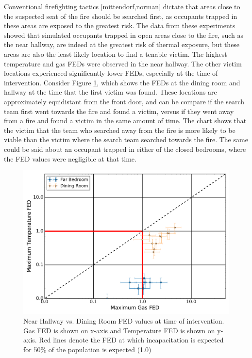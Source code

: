 \documentclass[12pt,oneside]{article}
\begin{document}
Conventional firefighting tactics [mittendorf,norman] dictate that areas close to the suspected seat of the fire should be searched first, as occupants trapped in these areas are exposed to the greatest risk. The data from these experiments showed that simulated occupants trapped in open areas close to the fire, such as the near hallway, are indeed at the greatest risk of thermal exposure, but these areas are also the least likely location to find a tenable victim. The highest temperature and gas FEDs were observed in the near hallway. The other victim locations experienced significantly lower FEDs, especially at the time of intervention. Consider Figure \ref{fig:open_FED_compare}, which shows the FEDs at the dining room and hallway at the time that the first victim was found. These locations are approximately equidistant from the front door, and can be compare if the search team first went towards the fire and found a victim, versus if they went away from a fire and found a victim in the same amount of time. The chart shows that the victim that the team who searched away from the fire is more likely to be viable than the victim where the search team searched towards the fire. The same could be said about an occupant trapped in either of the closed bedrooms, where the FED values were negligible at that time.  

\begin{figure}[!ht]
	\centering
	\includegraphics[width=.75\textwidth]{../Figures/br_compare/Far}
	\caption[Near Hallway vs. Dining Room FED values at time of intervention]{Near Hallway vs. Dining Room FED values at time of intervention. Gas FED is shown on x-axis and Temperature FED is shown on y-axis. Red lines denote the FED at which incapacitation is expected for 50\% of the population is expected (1.0)}
	\label{fig:open_FED_compare}
\end{figure}
\end{document}
